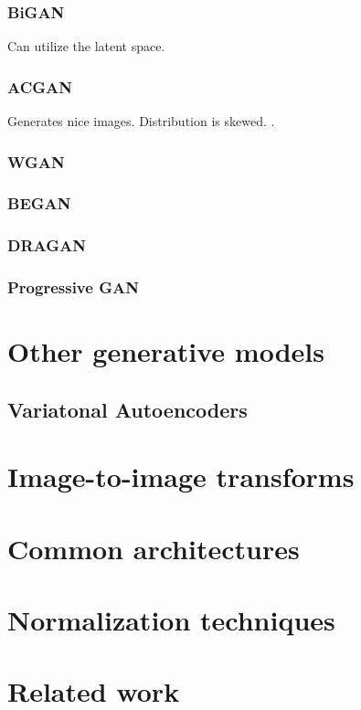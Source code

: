 \subsubsection{BiGAN}
Can utilize the latent space.
\subsubsection{ACGAN}
Generates nice images. \textcite{odena2016conditional} Distribution is skewed. \textcite{shuac2017acganisbad}.
\subsubsection{WGAN}
\subsubsection{BEGAN}
\subsubsection{DRAGAN}
\subsubsection{Progressive GAN}

\section{Other generative models}

\subsection{Variatonal Autoencoders}

\section{Image-to-image transforms}

\section{Common architectures}

\section{Normalization techniques}

\section{Related work}




